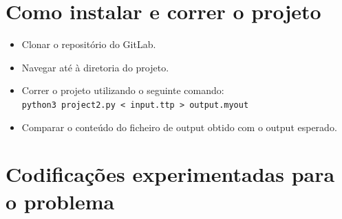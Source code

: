 \documentclass[12pt,a4paper]{article}
\begin{document}
    \section{Como instalar e correr o projeto}
        \begin{itemize}
            \item Clonar o repositório do GitLab.
            \item Navegar até à diretoria do projeto.
            \item Correr o projeto utilizando o seguinte comando: \\
                  \texttt{python3 project2.py < input.ttp > output.myout}
            \item Comparar o conteúdo do ficheiro de output obtido com o output esperado.
        \end{itemize}

    \section{Codificações experimentadas para o problema}
\end{document}

